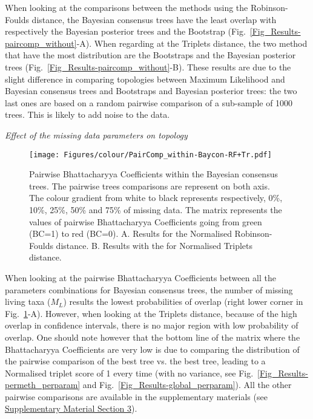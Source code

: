 \documentclass[12pt,letterpaper]{article}
\renewcommand{\subsection}[1]{%
\bigskip
\begin{center}
\begin{large}
\normalfont\itshape #1
\end{large}
\end{center}}
\begin{document}
When looking at the comparisons between the methods using the Robinson-Foulds distance, the Bayesian consensus trees have the least overlap with respectively the Bayesian posterior trees and the Bootstrap (Fig.~\ref{Fig_Results-paircomp_without}-A). When regarding at the Triplets distance, the two method that have the most distribution are the Bootstraps and the Bayesian posterior trees (Fig.~\ref{Fig_Results-paircomp_without}-B). These results are due to the slight difference in comparing topologies between Maximum Likelihood and Bayesian consensus trees and Bootstraps and Bayesian posterior trees: the two last ones are based on a random pairwise comparison of a sub-sample of 1000 trees. This is likely to add noise to the data.

\subsection{Effect of the missing data parameters on topology}

\begin{figure} 
\centering
    \texttt{[image: Figures/colour/PairComp\_within-Baycon-RF+Tr.pdf]}
\caption{Pairwise Bhattacharyya Coefficients within the Bayesian consensus trees. The pairwise trees comparisons are represent on both axis. The colour gradient from white to black represents respectively, 0\%, 10\%, 25\%, 50\% and 75\% of missing data. The matrix represents the values of pairwise Bhattacharyya Coefficients going from green (BC=1) to red (BC=0). A. Results for the Normalised Robinson-Foulds distance. B. Results with the for Normalised Triplets distance.}
\label{Fig_Results-paircomp_within}
\end{figure} %

When looking at the pairwise Bhattacharyya Coefficients between all the parameters combinations for Bayesian consensus trees, the number of missing living taxa ($M_{L}$) results the lowest probabilities of overlap (right lower corner in Fig.~\ref{Fig_Results-paircomp_within}-A). However, when looking at the Triplets distance, because of the high overlap in confidence intervals, there is no major region with low probability of overlap. One should note however that the bottom line of the matrix where the Bhattacharyya Coefficients are very low is due to comparing the distribution of the pairwise comparison of the best tree vs. the best tree, leading to a Normalised triplet score of 1 every time (with no variance, see Fig.~\ref{Fig_Results-permeth_perparam} and Fig.~\ref{Fig_Results-global_perparam}). All the other pairwise comparisons are available in the supplementary materials (see \hyperref[SupplementaryMaterial]{Supplementary Material Section 3}).
\end{document}
